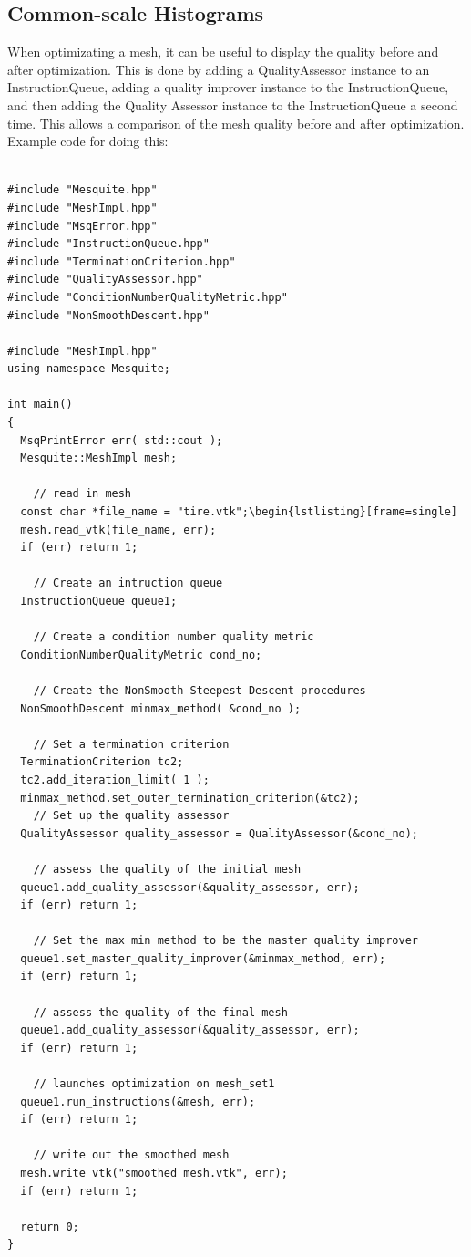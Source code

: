 \subsection{Common-scale Histograms}

When optimizating a mesh, it can be useful to display the quality before and after optimization.  This is done by adding a QualityAssessor instance to an InstructionQueue, adding a quality improver instance to the InstructionQueue, and then adding the Quality Assessor instance to the InstructionQueue a second time.  This allows a comparison of the mesh quality before and after optimization.  Example code for doing this:

\begin{lstlisting}[frame=single]

#include "Mesquite.hpp"
#include "MeshImpl.hpp"
#include "MsqError.hpp"
#include "InstructionQueue.hpp"
#include "TerminationCriterion.hpp"
#include "QualityAssessor.hpp"
#include "ConditionNumberQualityMetric.hpp"
#include "NonSmoothDescent.hpp"

#include "MeshImpl.hpp"
using namespace Mesquite;

int main()
{     
  MsqPrintError err( std::cout );
  Mesquite::MeshImpl mesh;

    // read in mesh
  const char *file_name = "tire.vtk";\begin{lstlisting}[frame=single]
  mesh.read_vtk(file_name, err);
  if (err) return 1;
  
    // Create an intruction queue
  InstructionQueue queue1;

    // Create a condition number quality metric 
  ConditionNumberQualityMetric cond_no;
  
    // Create the NonSmooth Steepest Descent procedures
  NonSmoothDescent minmax_method( &cond_no );

    // Set a termination criterion
  TerminationCriterion tc2;
  tc2.add_iteration_limit( 1 );
  minmax_method.set_outer_termination_criterion(&tc2);
    // Set up the quality assessor
  QualityAssessor quality_assessor = QualityAssessor(&cond_no);

    // assess the quality of the initial mesh
  queue1.add_quality_assessor(&quality_assessor, err); 
  if (err) return 1;

    // Set the max min method to be the master quality improver
  queue1.set_master_quality_improver(&minmax_method, err); 
  if (err) return 1;

    // assess the quality of the final mesh
  queue1.add_quality_assessor(&quality_assessor, err); 
  if (err) return 1;

    // launches optimization on mesh_set1
  queue1.run_instructions(&mesh, err); 
  if (err) return 1;

    // write out the smoothed mesh
  mesh.write_vtk("smoothed_mesh.vtk", err); 
  if (err) return 1;
  
  return 0;
}

\end{lstlisting}


